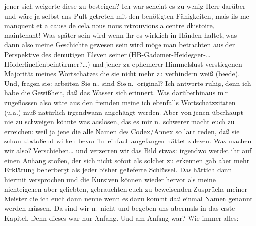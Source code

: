\documentclass[
]{article}
\begin{document}
jener sich weigerte diese zu besteigen? Ich war scheint es zu wenig Herr
darüber und wäre ja selbst ans Pult getreten mit den benötigten
Fähigkeiten, mais ils me manquent et a cause de cela nous nous
retrouvions a centre d\textquotesingle histoire, maintenant! Was später
sein wird wenn ihr es wirklich in Händen haltet, was dann also meine
Geschichte gewesen sein wird möge man betrachten aus der Perspektive des
demütigen Eleven seiner (HB-Gadamer-Heidegger-\ldots{}
Hölderlinelfenbeintürmer?\ldots) und jener zu ephemerer Himmelslust
verstiegenen Majorität meines Wortschatzes die sie nicht mehr zu
verhindern weiß (beede). Und, fragen sie: arbeiten Sie n., sind Sie
n.~original? Ich antworte ruhig, denn ich habe die Gewißheit, daß das
Wasser sich erinnert. Was darüberhinaus mir zugeflossen also wäre aus
den fremden meine ich ebenfalls Wortschatzzitaten (u.a.) muß natürlich
irgendwann angehängt werden. Aber von jenen überhaupt nie zu schweigen
könnte was auslösen, das es mir n.~schwerer macht euch zu erreichen:
weil ja jene die alle Namen des Codex/Annex so laut reden, daß sie schon
abstoßend wirken bevor ihr einfach angefangen hättet zulesen. Was machen
wir also? Verschieben\ldots{} und verzerren wir das Bild etwas: irgendwo
werdet ihr auf einen Anhang stoßen, der sich nicht sofort als solcher zu
erkennen gab aber mehr Erklärung beherbergt als jeder bisher gelieferte
Schlüssel. Das hättich dann hiermit versprochen und die Kursiven können
wieder hervor als meine nichteigenen aber geliebten, gebrauchten euch zu
beweisenden Zusprüche meiner Meister die ich euch dann nenne wenn es
dazu kommt daß einmal Namen genannt werden müssen. Da sind wir n.~nicht
und begeben uns abermals in das erste Kapitel. Denn dieses war nur
Anfang. Und am Anfang war? Wie immer alles:
\end{document}
